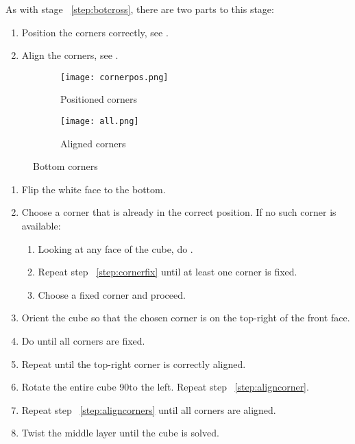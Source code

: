 As with stage ~\ref{step:botcross}, there are two parts to this stage: \begin{enumerate}
	\item Position the corners correctly, see .
	\item Align the corners, see .
\end{enumerate}
\begin{figure}[h]
	\centering
	\begin{subfigure}[b]{0.3\textwidth}
		\texttt{[image: cornerpos.png]}
		\caption{Positioned corners}\label{fig:cornerpos}
	\end{subfigure}
	\begin{subfigure}[b]{0.3\textwidth}
		\texttt{[image: all.png]}
		\caption{Aligned corners}\label{fig:all}
	\end{subfigure}
	\caption{Bottom corners}
\end{figure}	
\begin{enumerate}
	\item Flip the white face to the bottom.
	\item Choose a corner that is already in the correct position. If no such corner is available:\begin{enumerate}
		\item\label{step:cornerfix} Looking at any face of the cube, do .
		\item Repeat step ~\ref{step:cornerfix} until at least one corner is fixed.
		\item Choose a fixed corner and proceed.
	\end{enumerate}
	\item Orient the cube so that the chosen corner is on the top-right of the front face.
	\item Do  until all corners are fixed.
	\item\label{step:aligncorner} Repeat  until the top-right corner is correctly aligned.
	\item\label{step:aligncorners} Rotate the entire cube 90\degree to the left. Repeat step ~\ref{step:aligncorner}.
	\item Repeat step ~\ref{step:aligncorners} until all corners are aligned.
	\item Twist the middle layer until the cube is solved.
\end{enumerate}

